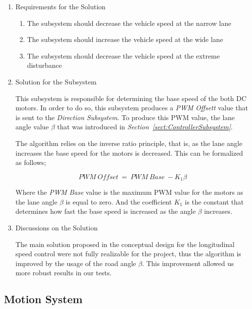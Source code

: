 \documentclass[a4paper,12pt]{article}
\begin{document}
		\begin{enumerate}
			\item {Requirements for the Solution}
			
				\begin{enumerate}
					\item The subsystem should decrease the vehicle speed at the narrow lane 
					\item The subsystem should increase the vehicle speed at the wide lane
					\item The subsystem should decrease the vehicle speed at the extreme disturbance  
				\end{enumerate}
					
			\item {Solution for the Subsystem}
			
			This subsystem is responsible for determining the base speed of the both DC motors. In order to do so, this subsystem produces a \textit{PWM Offsett} value that is sent to the \textit{Direction Subsystem}. To produce this PWM value, the lane angle value $\beta$ that was introduced in \textit{Section~\ref{sect:ControllerSubsystem}}.
			
			The algorithm relies on the inverse ratio principle, that is, as the lane angle increases the base speed for the motors is decreased. This can be formalized as follows;
			
			$$ PWM~Offset~=~PWM~Base~-K_1 \beta$$
			
			Where the \textit{PWM Base} value is the maximum PWM value for the motors as the lane angle $\beta$ is equal to zero. And the coefficient $K_1$ is the constant that determines how fast the base speed is increased as the angle $\beta$ increases.
			
			 
			\item {Discussions on the Solution}
						
	The main solution proposed in the conceptual design for the longitudinal speed control were not fully realizable for the project, thus the algorithm is improved by the usage of the road angle $\beta$. This improvement allowed us more robust results in our tests.
			
		\end{enumerate}
			
	
	
		
		
		\subsection{Motion System}
				
\end{document}
